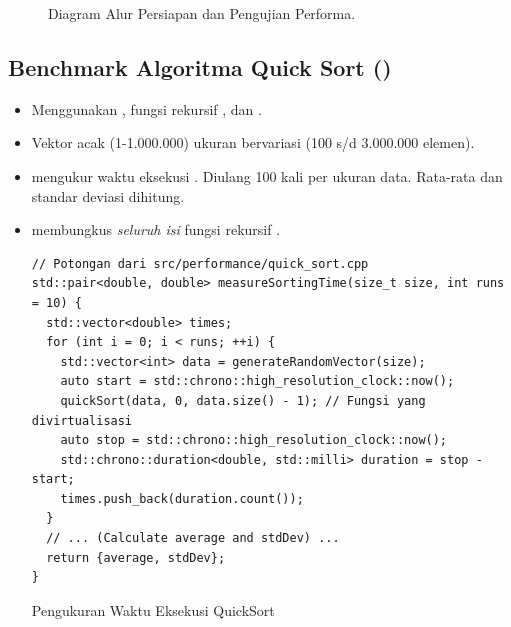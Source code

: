 \begin{figure}[htbp]
	\caption{Diagram Alur Persiapan dan Pengujian Performa.}
	\label{fig:flow_perf_rev} %
\end{figure}


\subsection{Benchmark Algoritma Quick Sort ()}
\begin{itemize}
	\item {} Menggunakan , fungsi rekursif , dan .
	\item {} Vektor acak (1-1.000.000) ukuran bervariasi (100 s/d 3.000.000 elemen).
	\item {}  mengukur waktu eksekusi . Diulang 100 kali per ukuran data. Rata-rata dan standar deviasi dihitung.
	\item {}  membungkus \textit{seluruh isi} fungsi rekursif .

	      \begin{listing}[H]
		      \begin{verbatim}
// Potongan dari src/performance/quick_sort.cpp
std::pair<double, double> measureSortingTime(size_t size, int runs = 10) {
  std::vector<double> times;
  for (int i = 0; i < runs; ++i) {
    std::vector<int> data = generateRandomVector(size);
    auto start = std::chrono::high_resolution_clock::now();
    quickSort(data, 0, data.size() - 1); // Fungsi yang divirtualisasi
    auto stop = std::chrono::high_resolution_clock::now();
    std::chrono::duration<double, std::milli> duration = stop - start;
    times.push_back(duration.count());
  }
  // ... (Calculate average and stdDev) ...
  return {average, stdDev};
}
        \end{verbatim}
		      \caption{Pengukuran Waktu Eksekusi QuickSort}
		      \label{lst:quicksort_measure}
	      \end{listing}
\end{itemize}

